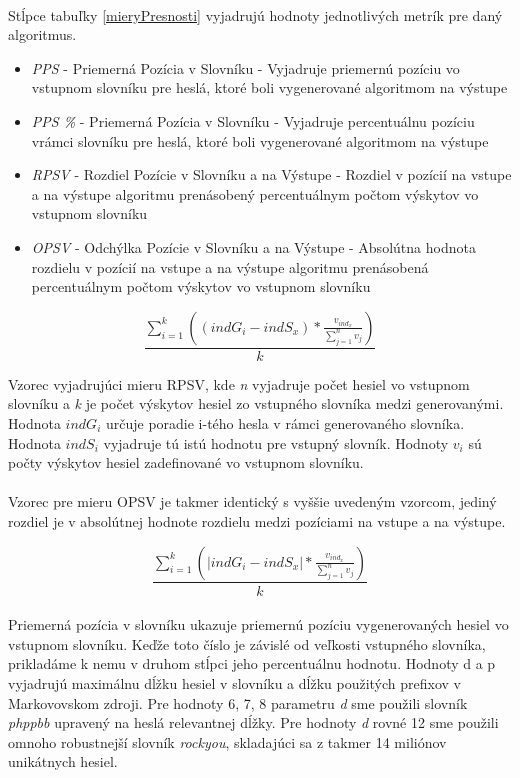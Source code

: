 \paragraph{}
Stĺpce tabuľky \ref{mieryPresnosti} vyjadrujú hodnoty jednotlivých metrík pre daný algoritmus.
\begin{itemize}
	\item \emph{PPS} - Priemerná Pozícia v Slovníku - Vyjadruje priemernú pozíciu vo vstupnom slovníku pre heslá, ktoré boli vygenerované algoritmom na výstupe
	\item \emph{PPS \%} - Priemerná Pozícia v Slovníku - Vyjadruje percentuálnu pozíciu vrámci slovníku pre heslá, ktoré boli vygenerované algoritmom na výstupe
	\item \emph{RPSV} - Rozdiel Pozície v Slovníku a na Výstupe - Rozdiel v pozícií na vstupe a na výstupe algoritmu prenásobený percentuálnym počtom výskytov vo vstupnom slovníku
    \item \emph{OPSV} - Odchýlka Pozície v Slovníku a na Výstupe - Absolútna hodnota rozdielu v pozícií na vstupe a na výstupe algoritmu prenásobená percentuálnym počtom výskytov vo vstupnom slovníku
\end{itemize}

\[ \frac{\displaystyle\sum_{i=1}^{k}((indG_i - indS_x) * \frac{v_{ind_x}}{\sum_{j=1}^{n}v_j})}{k} \]

Vzorec vyjadrujúci mieru RPSV, kde \emph{n} vyjadruje počet hesiel vo vstupnom slovníku a \emph{k} je počet výskytov hesiel zo vstupného slovníka medzi generovanými. Hodnota \emph{\(indG_i\)} určuje poradie i-tého hesla v rámci generovaného slovníka. Hodnota \emph{\(indS_i\)} vyjadruje tú istú hodnotu pre vstupný slovník. Hodnoty \emph{\(v_i\)} sú počty výskytov hesiel zadefinované vo vstupnom slovníku.

\paragraph{}
Vzorec pre mieru OPSV je takmer identický s vyššie uvedeným vzorcom, jediný rozdiel je v absolútnej hodnote rozdielu medzi pozíciami na vstupe a na výstupe.

\[ \frac{\displaystyle\sum_{i=1}^{k}(|indG_i - indS_x| * \frac{v_{ind_x}}{\sum_{j=1}^{n}v_j})}{k} \]

\paragraph{}
Priemerná pozícia v slovníku ukazuje priemernú pozíciu vygenerovaných hesiel vo vstupnom slovníku. Keďže toto číslo je závislé od veľkosti vstupného slovníka, prikladáme k nemu v druhom stĺpci jeho percentuálnu hodnotu. Hodnoty d a p vyjadrujú maximálnu dĺžku hesiel v slovníku a dĺžku použitých prefixov v Markovovskom zdroji. Pre hodnoty 6, 7, 8 parametru \emph{d} sme použili slovník \emph{phppbb} upravený na heslá relevantnej dĺžky. Pre hodnoty \emph{d} rovné 12 sme použili omnoho robustnejší slovník \emph{rockyou}, skladajúci sa z takmer 14 miliónov unikátnych hesiel.

